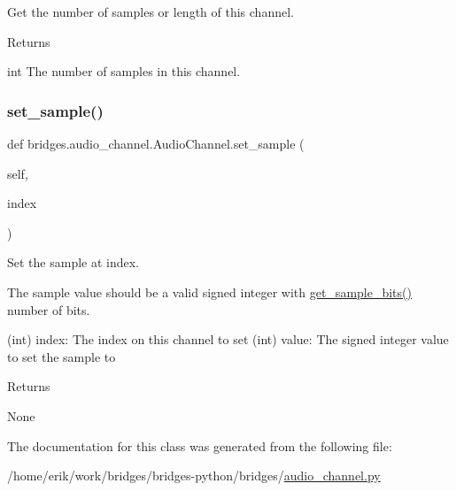 Get the number of samples or length of this channel. 

\begin{DoxyReturn}{Returns}


int The number of samples in this channel. 
\end{DoxyReturn}
\mbox{\label{classbridges_1_1audio__channel_1_1_audio_channel_adc84cb1c65d84184353603d9fd051017}} 
\subsubsection{\texorpdfstring{set\+\_\+sample()}{set\_sample()}}
{\footnotesize\ttfamily def bridges.\+audio\+\_\+channel.\+Audio\+Channel.\+set\+\_\+sample (\begin{DoxyParamCaption}\item[{}]{self,  }\item[{}]{index }\end{DoxyParamCaption})}



Set the sample at index. 

The sample value should be a valid signed integer with \hyperlink{classbridges_1_1audio__channel_1_1_audio_channel_ae9b2e6e0f5aaebc5adc21815f4fe2f9a}{get\+\_\+sample\+\_\+bits()} number of bits. \begin{DoxyVerb}           (int) index: The index on this channel to set
           (int) value: The signed integer value to set the sample to
\end{DoxyVerb}
 \begin{DoxyReturn}{Returns}


None 
\end{DoxyReturn}


The documentation for this class was generated from the following file\+:\begin{DoxyCompactItemize}
\item 
/home/erik/work/bridges/bridges-\/python/bridges/\hyperlink{audio__channel_8py}{audio\+\_\+channel.\+py}\end{DoxyCompactItemize}

